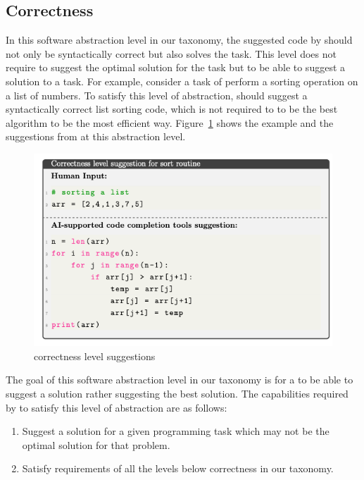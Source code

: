 \subsection{Correctness}
\label{correctness}
In this software abstraction level in our taxonomy, the suggested code by \cct{} should not only be syntactically correct but also solves the task. 
This level does not require \cct{} to suggest the optimal solution for the task but to be able to suggest a solution to a task.
For example, consider a task of perform a sorting operation on a list of numbers. To satisfy this level of abstraction, \cct{} should suggest a syntactically correct list sorting code, which is not required to to be the best algorithm to be the most efficient way.
Figure~\ref{fig:correctness} shows the example and the suggestions from \cct{} at this abstraction level.

\begin{figure}[hbt!]
    \centering
    \includegraphics[width=.9\linewidth]{Figures/correctness.png}
    \caption{\cct{} correctness level suggestions}
    \label{fig:correctness}
\end{figure}

The goal of this software abstraction level in our taxonomy is for a \cct{} to be able to suggest a solution rather suggesting the best solution.
The capabilities required by \cct{} to satisfy this level of abstraction are as follows:

\begin{enumerate}
    \item Suggest a solution for a given programming task which may not be the optimal solution for that problem.
    \item Satisfy requirements of all the levels below correctness in our taxonomy.
\end{enumerate}


